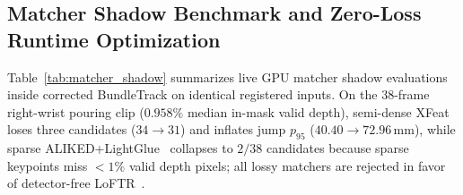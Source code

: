 \documentclass{evidencescene}
\begin{document}
\subsection{Matcher Shadow Benchmark and Zero-Loss Runtime Optimization}
\label{sec:exp_runtime}
Table~\ref{tab:matcher_shadow} summarizes live GPU matcher shadow evaluations inside corrected BundleTrack on identical registered inputs. On the $38$-frame right-wrist pouring clip ($0.958\%$ median in-mask valid depth), semi-dense XFeat~\cite{xfeat} loses three candidates ($34\to 31$) and inflates jump $p_{95}$ ($40.40\to 72.96\,\mathrm{mm}$), while sparse ALIKED+LightGlue~\cite{aliked,lightglue} collapses to $2/38$ candidates because sparse keypoints miss $<1\%$ valid depth pixels; all lossy matchers are rejected in favor of detector-free LoFTR~\cite{loftr}.

\begin{table}[t]\centering\footnotesize
\caption{Feature matcher shadow evaluation inside corrected BundleTrack on Laval (Clock/Jar, live PyTorch FP32 matcher harness) and the $38$-frame right-wrist pouring clip ($0.958\%$ median in-mask valid depth).}\label{tab:matcher_shadow}
\end{table}
\end{document}
